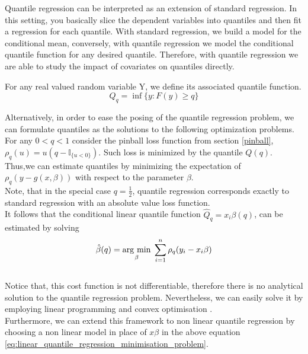 Quantile regression can be interpreted as an extension of standard regression. In this setting, you basically slice the dependent variables into quantiles and then fit a regression for each quantile. With standard regression, we build a model for the conditional mean, conversely, with quantile regression we model the conditional quantile function for any desired quantile. 
Therefore, with quantile regression we are able to study the impact of covariates on quantiles directly.
\begin{definition}
    For any real valued random variable Y, we define its associated quantile function.
    \begin{equation}
        Q_q=\inf\{y:F(y)\geq q\}
    \end{equation}
\end{definition}
Alternatively, in order  to ease the posing of the quantile regression problem, we can formulate quantiles as the solutions to the following optimization problems.
\\
For any $0<q<1$ consider the pinball loss function from section \ref{pinball}, $\rho_q(u)=u(q-\mathbb{I}_{\{u<0\}})$. 
Such loss is minimized by the quantile $Q(q)$.
Thus,we can estimate quantiles by minimizing the expectation of $\rho_q(y-g(x,\beta))$ with respect to the parameter $\beta$.
\\
Note, that in the special case $q=\frac{1}{2}$,  quantile regression corresponds exactly to standard regression with an absolute value loss function.
\\
It follows that the conditional linear quantile function $\hat{Q}_q=x_i\beta(q)$, can be estimated by solving
\begin{equation}\label{eq:linear_quantile_regression_minimisation_problem}
    \hat{\beta}(q)=\underset{\beta}{\operatorname{arg}\,\operatorname{min}}\;\sum\limits_{i=1}^n \rho_q   (y_i-x_i \beta)
\end{equation}
\\
Notice that, this cost function is not differentiable, therefore there is no analytical solution to the quantile regression problem. Nevertheless, we can easily solve it by employing linear programming and convex optimisation \cite{boyd2004convex}.
\\
Furthermore, we can extend this framework to non linear quantile regression by choosing a non linear model in place of $x\beta$ in the above equation \ref{eq:linear_quantile_regression_minimisation_problem}.
